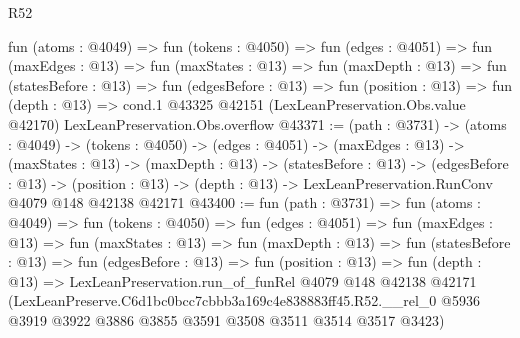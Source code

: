 \begin{lexlean}{R52}
\begin{coremodule}
  fun (atoms : @4049) =>
  fun (tokens : @4050) =>
  fun (edges : @4051) =>
  fun (maxEdges : @13) =>
  fun (maxStates : @13) =>
  fun (maxDepth : @13) =>
  fun (statesBefore : @13) =>
  fun (edgesBefore : @13) =>
  fun (position : @13) =>
  fun (depth : @13) =>
  cond.{1} @43325 @42151 (LexLeanPreservation.Obs.value @42170) LexLeanPreservation.Obs.overflow
@43371 := (path : @3731) ->
  (atoms : @4049) ->
  (tokens : @4050) ->
  (edges : @4051) ->
  (maxEdges : @13) ->
  (maxStates : @13) ->
  (maxDepth : @13) ->
  (statesBefore : @13) ->
  (edgesBefore : @13) ->
  (position : @13) -> (depth : @13) -> LexLeanPreservation.RunConv @4079 @148 @42138 @42171
@43400 := fun (path : @3731) =>
  fun (atoms : @4049) =>
  fun (tokens : @4050) =>
  fun (edges : @4051) =>
  fun (maxEdges : @13) =>
  fun (maxStates : @13) =>
  fun (maxDepth : @13) =>
  fun (statesBefore : @13) =>
  fun (edgesBefore : @13) =>
  fun (position : @13) =>
  fun (depth : @13) =>
  LexLeanPreservation.run_of_funRel
    @4079
    @148
    @42138
    @42171
    (LexLeanPreserve.C6d1bc0bcc7cbbb3a169c4e838883ff45.R52.__rel_0
      @5936
      @3919
      @3922
      @3886
      @3855
      @3591
      @3508
      @3511
      @3514
      @3517
      @3423)
\end{coremodule}
\end{lexlean}
